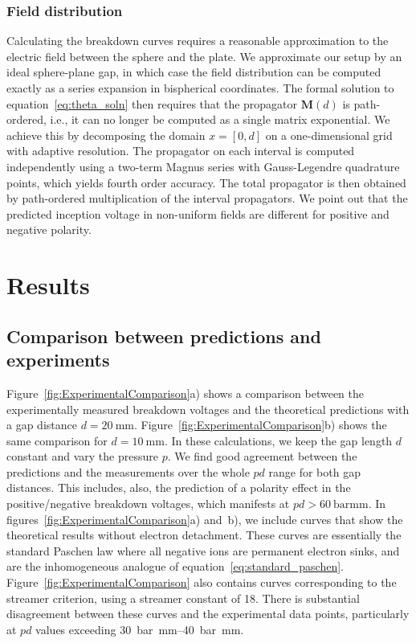 \documentclass{iopjournal}
\begin{document}
\subsubsection{Field distribution}
Calculating the breakdown curves requires a reasonable approximation to the electric field between the sphere and the plate.
We approximate our setup by an ideal sphere-plane gap, in which case the field distribution can be computed exactly as a series expansion in bispherical coordinates.
The formal solution to equation~\eqref{eq:theta_soln} then requires that the propagator $\bm{M}(d)$ is path-ordered, i.e., it can no longer be computed as a single matrix exponential.
We achieve this by decomposing the domain $x=[0,d]$ on a one-dimensional grid with adaptive resolution.
The propagator on each interval is computed independently using a two-term Magnus series with Gauss-Legendre quadrature points, which yields fourth order accuracy.
The total propagator is then obtained by path-ordered multiplication of the interval propagators.
We point out that the predicted inception voltage in non-uniform fields are different for positive and negative polarity.




\section{Results}
\label{sec:results}


\subsection{Comparison between predictions and experiments}
Figure~\ref{fig:ExperimentalComparison}a) shows a comparison between the experimentally measured breakdown voltages and the theoretical predictions with a gap distance $d = \SI{20}{\milli\meter}$.
Figure~\ref{fig:ExperimentalComparison}b) shows the same comparison for $d = \SI{10}{\milli\meter}$.
In these calculations, we keep the gap length $d$ constant and vary the pressure $p$.
We find good agreement between the predictions and the measurements over the whole $pd$ range for both gap distances.
This includes, also, the prediction of a polarity effect in the positive/negative breakdown voltages, which manifests at $pd > \SI{60}{\bar\milli\meter}$.
In figures~\ref{fig:ExperimentalComparison}a) and~b), we include curves that show the theoretical results without electron detachment.
These curves are essentially the standard Paschen law where all negative ions are permanent electron sinks, and are the inhomogeneous analogue of equation~\eqref{eq:standard_paschen}.
Figure~\ref{fig:ExperimentalComparison} also contains curves corresponding to the streamer criterion, using a streamer constant of \num{18}.
There is substantial disagreement between these curves and the experimental data points, particularly at $pd$ values exceeding \SIrange{30}{40}{\bar\milli\meter}.
\end{document}

